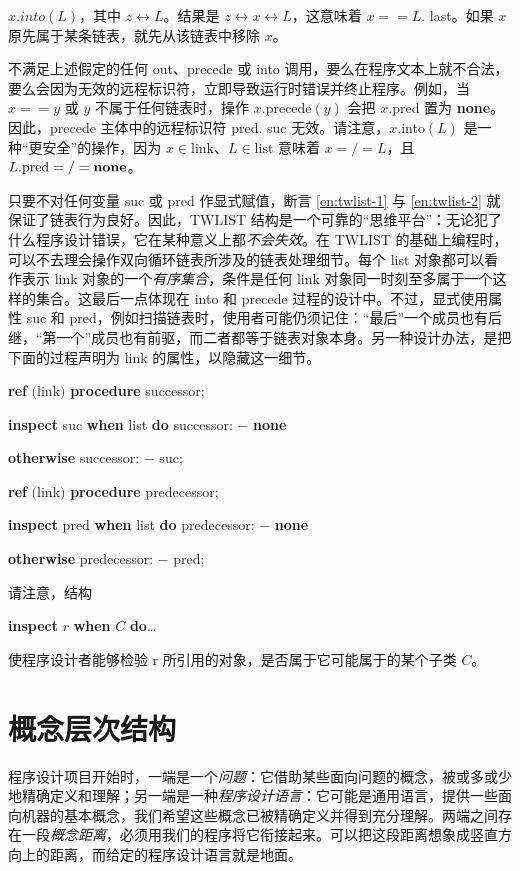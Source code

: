 \noindent
$x.into(L)$，其中 $z \leftrightarrow L$。结果是 $z \leftrightarrow x \leftrightarrow L$，这意味着 $x == L$. last。如果 $x$ 原先属于某条链表，就先从该链表中移除 $x$。

不满足上述假定的任何 out、precede 或 into 调用，要么在程序文本上就不合法，要么会因为无效的远程标识符，立即导致运行时错误并终止程序。例如，当 $x == y$ 或 $y$ 不属于任何链表时，操作 $x$.precede$(y)$ 会把 $x$.pred 置为 \textbf{none}。因此，precede 主体中的远程标识符 pred. suc 无效。请注意，$x$.into$(L)$ 是一种“更安全”的操作，因为 $x \in \text{link}$、$L \in \text{list}$ 意味着 $x =/= L$，且 $L.\text{pred} =/= \text{\textbf{none}}$。

只要不对任何变量 suc 或 pred 作显式赋值，断言 \ref{en:twlist-1} 与 \ref{en:twlist-2} 就保证了链表行为良好。因此，TWLIST 结构是一个可靠的“思维平台”：无论犯了什么程序设计错误，它在某种意义上都\textit{不会失效}。在 TWLIST 的基础上编程时，可以不去理会操作双向循环链表所涉及的链表处理细节。每个 list 对象都可以看作表示 link 对象的一个\textit{有序集合}，条件是任何 link 对象同一时刻至多属于一个这样的集合。这最后一点体现在 into 和 precede 过程的设计中。不过，显式使用属性 suc 和 pred，例如扫描链表时，使用者可能仍须记住：“最后”一个成员也有后继，“第一个”成员也有前驱，而二者都等于链表对象本身。另一种设计办法，是把下面的过程声明为 link 的属性，以隐藏这一细节。

\quad \textbf{ref} $($link$)$ \textbf{procedure} successor;

\quad \quad \textbf{inspect} suc \textbf{when} list \textbf{do} successor: $-$ \textbf{none}

\quad \quad \textbf{otherwise} successor: $-$ suc;

\quad \textbf{ref} $($link$)$ \textbf{procedure} predecessor;

\quad \quad \textbf{inspect} pred \textbf{when} list \textbf{do} predecessor: $-$ \textbf{none}

\quad \quad \textbf{otherwise} predecessor: $-$ pred;

请注意，结构

\quad \textbf{inspect} $r$ \textbf{when} $C$ \textbf{do}\dots

\noindent
使程序设计者能够检验 r 所引用的对象，是否属于它可能属于的某个子类 $C$。

\section{概念层次结构}

程序设计项目开始时，一端是一个\textit{问题}：它借助某些面向问题的概念，被或多或少地精确定义和理解；另一端是一种\textit{程序设计语言}：它可能是通用语言，提供一些面向机器的基本概念，我们希望这些概念已被精确定义并得到充分理解。两端之间存在一段\textit{概念距离}，必须用我们的程序将它衔接起来。可以把这段距离想象成竖直方向上的距离，而给定的程序设计语言就是地面。

